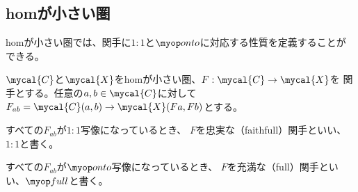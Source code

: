 \subsection{homが小さい圏}\label{s2:homが小さい圏} %
	homが小さい圏では、関手に$1:1$と$\onto$に対応する性質を定義することが
	できる。
	\begin{definition}[忠実と充満]\label{def:忠実と充満} %
		$\mycal{C}$と$\mycal{X}$をhomが小さい圏、$F:\mycal{C}\to\mycal{X}$を
		関手とする。任意の$a,b\in\mycal{C}$に対して
		$F_{ab}=\mycal{C}(a,b)\to\mycal{X}(Fa,Fb)$とする。
		\begin{description}\setlength{\itemsep}{-1mm} %
			\item[忠実] すべての$F_{ab}$が$1:1$写像になっているとき、
			$F$を忠実な（faithfull）関手といい、$1:1$と書く。
			\item[充満] すべての$F_{ab}$が$\onto$写像になっているとき、
			$F$を充満な（full）関手といい、$\full$と書く。
		\end{description} %
	\end{definition} %
\endgroup %
